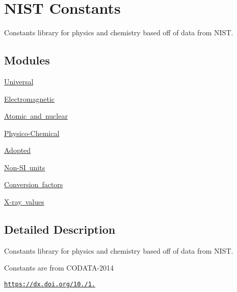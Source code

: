 \hypertarget{group___n_i_s_t_const}{}\section{N\+I\+ST Constants}
\label{group___n_i_s_t_const}


Constants library for physics and chemistry based off of data from N\+I\+ST.  


\subsection*{Modules}
\begin{DoxyCompactItemize}
\item 
\mbox{\hyperlink{group___n_i_s_t_const-_universal}{Universal}}
\item 
\mbox{\hyperlink{group___n_i_s_t_const-_electromagnetic}{Electromagnetic}}
\item 
\mbox{\hyperlink{group___n_i_s_t_const-_atomic}{Atomic and nuclear}}
\item 
\mbox{\hyperlink{group___n_i_s_t_const-_physico_chemical}{Physico-\/\+Chemical}}
\item 
\mbox{\hyperlink{group___n_i_s_t_const-_adopted}{Adopted}}
\item 
\mbox{\hyperlink{group___n_i_s_t_const-_non-_s_i}{Non-\/\+S\+I units}}
\item 
\mbox{\hyperlink{group___n_i_s_t_const-_conversion_factors}{Conversion factors}}
\item 
\mbox{\hyperlink{group___n_i_s_t_const-_x-ray}{X-\/ray values}}
\end{DoxyCompactItemize}


\subsection{Detailed Description}
Constants library for physics and chemistry based off of data from N\+I\+ST. 

Constants are from C\+O\+D\+A\+T\+A-\/2014

\href{https://dx.doi.org/10.1063/1.4954402}{\tt https\+://dx.\+doi.\+org/10./1.} 
